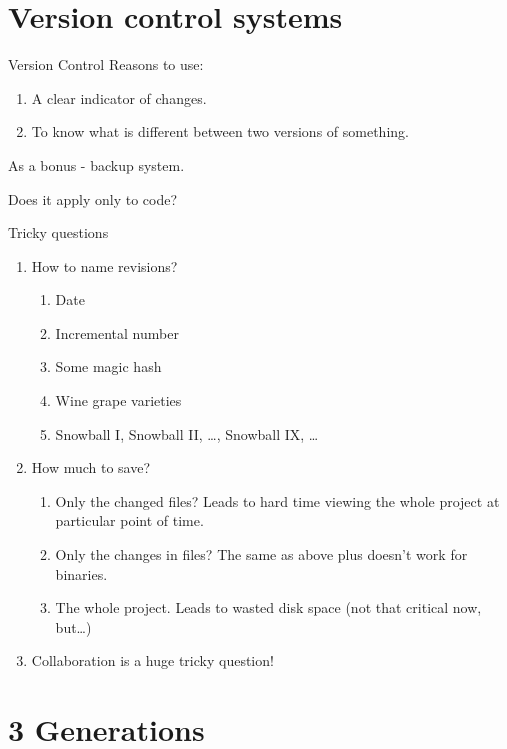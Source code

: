 \documentclass[presentation,aspectratio=169,smaller]{beamer}
\begin{document}
\section{Version control systems}
\label{sec:org60879f1}

\begin{frame}[label={sec:org95ac4f1}]{Version Control}
Reasons to use:

\begin{enumerate}
\item A clear indicator of changes.
\item To know what is different between two versions of something.
\end{enumerate}

As a bonus - backup system.

Does it apply only to \alert{code}?
\end{frame}

\begin{frame}[label={sec:orgd99c47b}]{Tricky questions}
\begin{enumerate}
\item How to name revisions?
\begin{enumerate}
\item Date
\item Incremental number
\item Some magic hash
\item Wine grape varieties
\item Snowball I, Snowball II, \ldots{}, Snowball IX, \ldots{}
\end{enumerate}
\item How much to save?
\begin{enumerate}
\item Only the changed files? Leads to hard time viewing the whole project at
particular point of time.
\item Only the changes in files? The same as above plus doesn't work for
binaries.
\item The whole project. Leads to wasted disk space (not that critical now,
but\ldots{})
\end{enumerate}
\item Collaboration is a huge tricky question!
\end{enumerate}
\end{frame}

\section{3 Generations}
\label{sec:org8eb430c}
\end{document}

